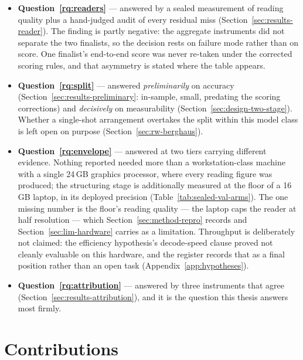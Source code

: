 \begin{itemize}
  \item \textbf{Question~\ref{rq:readers}} --- answered by a sealed measurement of
        reading quality plus a hand-judged audit of every residual miss
        (Section~\ref{sec:results-reader}). The finding is partly negative: the
        aggregate instruments did not separate the two finalists, so the decision
        rests on failure mode rather than on score. One finalist's end-to-end
        score was never re-taken under the corrected scoring rules, and that
        asymmetry is stated where the table appears.
  \item \textbf{Question~\ref{rq:split}} --- answered \emph{preliminarily} on
        accuracy (Section~\ref{sec:results-preliminary}: in-sample, small, predating
        the scoring corrections) and \emph{decisively} on measurability
        (Section~\ref{sec:design-two-stage}). Whether a single-shot arrangement
        overtakes the split within this model class is left open on purpose
        (Section~\ref{sec:rw-berghaus}).
  \item \textbf{Question~\ref{rq:envelope}} --- answered at two tiers carrying
        different evidence. Nothing reported needed more than a workstation-class
        machine with a single 24\,\ac{GB} graphics processor, where every reading
        figure was produced; the structuring stage is additionally measured at the
        floor of a 16\,\ac{GB} laptop, in its deployed precision
        (Table~\ref{tab:sealed-val-arms}). The one missing number is the floor's
        reading quality --- the laptop caps the reader at half resolution --- which
        Section~\ref{sec:method-repro} records and Section~\ref{sec:lim-hardware} carries as a
        limitation. Throughput is deliberately not claimed: the efficiency
        hypothesis's decode-speed clause proved not cleanly evaluable on this
        hardware, and the register records that as a final position rather than
        an open task (Appendix~\ref{app:hypotheses}).
  \item \textbf{Question~\ref{rq:attribution}} --- answered by three instruments
        that agree (Section~\ref{sec:results-attribution}), and it is the question this
        thesis answers most firmly.
\end{itemize}

\section{Contributions}
\label{sec:contributions}

